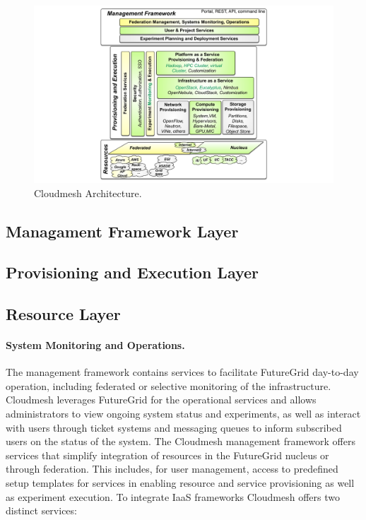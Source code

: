 \documentclass{tex/sig-alternate-2013}
\newcommand{\todo}[1]{{\color{red}{#1}}}
\begin{document}
\begin{figure}[htb]
  \centering
    \includegraphics[width=1.0\columnwidth]{images/cm-arch.pdf}
    \vspace{-24pt}
  \caption{Cloudmesh Architecture.}\label{F;arch}
\end{figure}

\subsection{Managament Framework Layer}

\subsection{Provisioning and Execution Layer}

\subsection{Resource Layer}



\paragraph{System Monitoring and Operations.}
\todo{read}

The management framework contains services to facilitate FutureGrid day-to-day operation, including federated or selective monitoring of the infrastructure. Cloudmesh leverages FutureGrid for the operational services and allows administrators to view ongoing system status and experiments, as well as interact with users through ticket systems and messaging queues to inform subscribed users on the status of the system.
The Cloudmesh management framework offers services that simplify integration of resources in the FutureGrid nucleus or through federation. This includes, for user management, access to predefined setup templates for services in enabling resource and service provisioning as well as experiment execution. To integrate IaaS frameworks Cloudmesh offers two distinct services:
\end{document}
